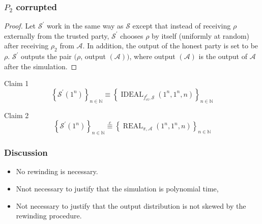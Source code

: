 \documentclass{beamer}
\begin{document}
    \begin{frame}
        \frametitle{$P_{2}$ corrupted}
        \begin{proof}
            Let $\mathcal{S}^{\prime}$ work in the same way as $\mathcal{S}$ except that instead of receiving $\rho$ externally from the trusted party, $\mathcal{S}^{\prime}$ chooses $\rho$ by itself (uniformly at random) after receiving $\rho_{2}$ from $\mathcal{A} .$ In addition, the output of the honest party is set to be $\rho .$ 
            $\mathcal{S}^{\prime}$ outputs the pair $(\rho$, output $(\mathcal{A}))$, where output $(\mathcal{A})$ is the output of $\mathcal{A}$ after the simulation. 
        \end{proof}

        \begin{block}{Claim 1}
            $$
            \left\{\mathcal{S}^{\prime}\left(1^{n}\right)\right\}_{n \in \mathbb{N}} \equiv\left\{\operatorname{IDEAL}_{f_{\mathrm{ct}}^{\ell}, \mathcal{S}}\left(1^{n}, 1^{n}, n\right)\right\}_{n \in \mathbb{N}}
            $$
        \end{block}


        \begin{block}{Claim 2}
            $$
            \left\{\mathcal{S}^{\prime}\left(1^{n}\right)\right\}_{n \in \mathbb{N}} \stackrel{c}{\equiv}\left\{\operatorname{REAL}_{\pi, \mathcal{A}}\left(1^{n}, 1^{n}, n\right)\right\}_{n \in \mathbb{N}}
            $$
            
        \end{block}
    
        
    
    \end{frame}

    \begin{frame}
        \frametitle{Discussion}
        \begin{itemize}
            \item No rewinding is necessary. 
            \item Nnot necessary to justify that the simulation is polynomial time, 
            \item Not necessary to justify that the output distribution is not skewed by the rewinding procedure.
        \end{itemize}
    
        
    
    \end{frame}
\end{document}
